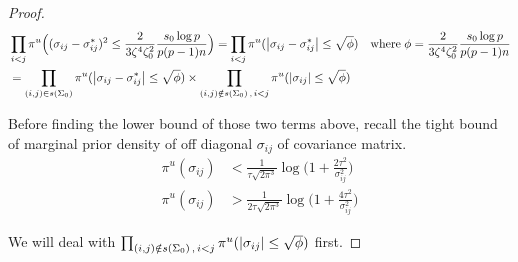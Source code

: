 \begin{proof}
    \begin{align*}
        &\prod_{i < j} \pi^u\Big((\sigma_{ij}- \sigma_{ij}^*)^2\leq \frac{2}{3\zeta^4\zeta_0^2}\frac{s_0\log p}{p(p-1)n} \Big) = \prod_{i<j} \pi^u(\abs{\sigma_{ij} - \sigma_{ij}^*}\leq \sqrt \phi)  \quad \text{where} \; \phi = \frac{2}{3\zeta^4\zeta_0^2}\frac{s_0\log p}{p(p-1)n} \\
        &= \prod_{(i,j)\in s(\Sigma_0)}\pi^u(\abs{\sigma_{ij} - \sigma_{ij}^*}\leq \sqrt \phi) \times \prod_{(i,j) \notin s(\Sigma_0)\, ,\, i<j}\pi^u(\abs{\sigma_{ij}}\leq \sqrt \phi) 
    \end{align*}

    Before finding the lower bound of those two terms above, recall the tight bound of marginal prior density of off diagonal $\sigma_{ij}$ of covariance matrix.
    \begin{align*}
        \pi^u(\sigma_{ij}) &< \frac{1}{\tau \sqrt{2\pi^3}}\log\Big(1+\frac{2\tau^2}{\sigma_{ij}^2} \Big) \\
        \pi^u(\sigma_{ij}) &> \frac{1}{2\tau \sqrt{2\pi^3}}\log\Big(1+\frac{4\tau^2}{\sigma_{ij}^2} \Big) 
    \end{align*}
    
    We will deal with $\prod_{(i,j) \notin s(\Sigma_0)\, ,\, i<j}\pi^u(\abs{\sigma_{ij}}\leq \sqrt \phi)$ first. 


\end{proof}

